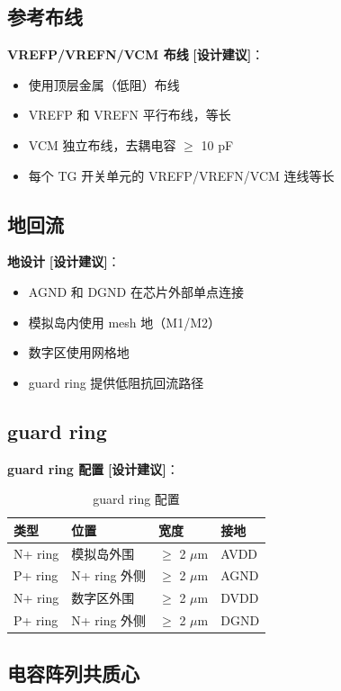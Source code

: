 \documentclass[UTF8,a4paper,11pt]{ctexart}
\newcommand{\suggested}{\textcolor{suggestblue}{\textbf{[设计建议]}}}
\providecommand{\textmu}{\ensuremath{\mu}}
\begin{document}
\subsection{参考布线}

\textbf{VREFP/VREFN/VCM 布线} \suggested：
\begin{itemize}[leftmargin=2em]
\item 使用顶层金属（低阻）布线
\item VREFP 和 VREFN 平行布线，等长
\item VCM 独立布线，去耦电容 $\geq$ 10 pF
\item 每个 TG 开关单元的 VREFP/VREFN/VCM 连线等长
\end{itemize}

\subsection{地回流}

\textbf{地设计} \suggested：
\begin{itemize}[leftmargin=2em]
\item AGND 和 DGND 在芯片外部单点连接
\item 模拟岛内使用 mesh 地（M1/M2）
\item 数字区使用网格地
\item guard ring 提供低阻抗回流路径
\end{itemize}

\subsection{guard ring}

\textbf{guard ring 配置} \suggested：

\begin{table}[H]
\centering
\caption{guard ring 配置}
\label{tab:guard-ring}
\begin{tabular}{llll}
\toprule
类型 & 位置 & 宽度 & 接地 \\
\midrule
N+ ring & 模拟岛外围     & $\geq$ 2 \textmu m & AVDD \\
P+ ring & N+ ring 外侧  & $\geq$ 2 \textmu m & AGND \\
N+ ring & 数字区外围     & $\geq$ 2 \textmu m & DVDD \\
P+ ring & N+ ring 外侧  & $\geq$ 2 \textmu m & DGND \\
\bottomrule
\end{tabular}
\end{table}

\subsection{电容阵列共质心}
\end{document}
